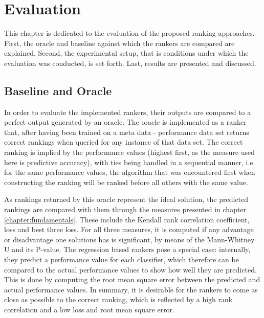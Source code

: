 %
\chapter{Evaluation}
\label{sec:evaluation}

This chapter is dedicated to the evaluation of the proposed ranking approaches. First, the oracle and baseline against which the rankers are compared are explained. Second, the experimental setup, that is conditions under which the evaluation was conducted, is set forth. Last, results are presented and discussed.

\section{Baseline and Oracle}
In order to evaluate the implemented rankers, their outputs are compared to a perfect output generated by an oracle. The oracle is implemented as a ranker that, after having been trained on a meta data - performance data set returns correct rankings when queried for any instance of that data set. The correct ranking is implied by the performance values (highest first, as the measure used here is predictive accuracy), with ties being handled in a sequential manner, i.e. for the same performance values, the algorithm that was encountered first when constructing the ranking will be ranked before all others with the same value.

As rankings returned by this oracle represent the ideal solution, the predicted rankings are compared with them through the measures presented in chapter \ref{chapter:fundamentals}. These include the Kendall rank correlation coefficient, loss and best three loss. For all three measures, it is computed if any advantage or disadvantage one solutions has is significant, by means of the Mann-Whitney U and its P-value. The regression based rankers pose a special case: internally, they predict a performance value for each classifier, which therefore can be compared to the actual performance values to show how well they are predicted. This is done by computing the root mean square error between the predicted and actual performance values. In summary, it is desirable for the rankers to come as close as possible to the correct ranking, which is reflected by a high rank correlation and a low loss and root mean square error.

